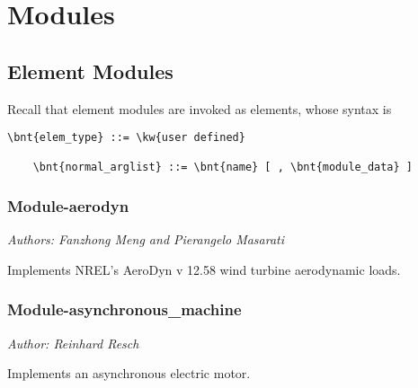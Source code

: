%
%
%
%
%
% 
%
%

\chapter{Modules}

\section{Element Modules}
Recall that element modules are invoked as  elements,
whose syntax is
\begin{Verbatim}[commandchars=\\\{\}]
    \bnt{elem_type} ::= \kw{user defined}

    \bnt{normal_arglist} ::= \bnt{name} [ , \bnt{module_data} ]
\end{Verbatim}

\subsection{Module-aerodyn}
\emph{Authors: Fanzhong Meng and Pierangelo Masarati}

\noindent
Implements NREL's AeroDyn v 12.58 wind turbine aerodynamic loads.

\subsection{Module-asynchronous\_machine}
\emph{Author: Reinhard Resch}

\noindent
Implements an asynchronous electric motor.

